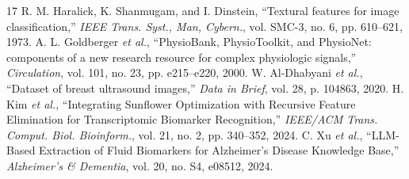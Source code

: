 \documentclass[conference]{IEEEtran}
\begin{document}
\begin{thebibliography}{17}
 R. M. Haralick, K. Shanmugam, and I. Dinstein, ``Textural features for image classification,'' \textit{IEEE Trans. Syst., Man, Cybern.}, vol. SMC-3, no. 6, pp. 610--621, 1973.
 A. L. Goldberger \textit{et al.}, ``PhysioBank, PhysioToolkit, and PhysioNet: components of a new research resource for complex physiologic signals,'' \textit{Circulation}, vol. 101, no. 23, pp. e215--e220, 2000.
 W. Al-Dhabyani \textit{et al.}, ``Dataset of breast ultrasound images,'' \textit{Data in Brief}, vol. 28, p. 104863, 2020.
 H. Kim \textit{et al.}, ``Integrating Sunflower Optimization with Recursive Feature Elimination for Transcriptomic Biomarker Recognition,'' \textit{IEEE/ACM Trans. Comput. Biol. Bioinform.}, vol. 21, no. 2, pp. 340--352, 2024.
 C. Xu \textit{et al.}, ``LLM-Based Extraction of Fluid Biomarkers for Alzheimer's Disease Knowledge Base,'' \textit{Alzheimer's \& Dementia}, vol. 20, no. S4, e08512, 2024.
\end{thebibliography}
\end{document}
